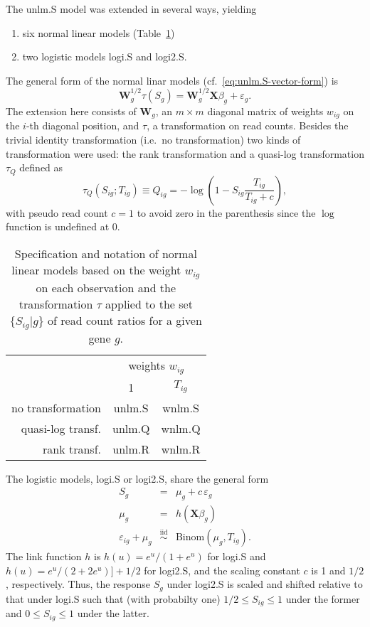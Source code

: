 \documentclass[letterpaper]{article}
\begin{document}
The unlm.S model was extended in several ways, yielding
\begin{enumerate}
\item six normal linear models (Table~\ref{tab:nlm})
\item two logistic models logi.S and logi2.S.
\end{enumerate}

The general form of the normal linar models
(cf.~\ref{eq:unlm.S-vector-form}) is
\begin{equation}
\mathbf{W}_g^{1/2} \tau(S_g) = \mathbf{W}_g^{1/2} \mathbf{X} \beta_g + \varepsilon_g.
\label{eq:nlm-general}
\end{equation}
The extension here consists of \(\mathbf{W}_g\), an \(m\times m\) diagonal matrix of
weights \(w_{ig}\) on the \(i\)-th diagonal position, and \(\tau\), a
transformation on read counts.  Besides the trivial identity transformation
(i.e.~no transformation) two kinds of transformation were used: the rank
transformation and a quasi-log transformation \(\tau_Q\) defined as
\begin{equation}
\tau_Q(S_{ig};T_{ig}) \equiv Q_{ig} = - \log \left( 1 - S_{ig} \frac{T_{ig}}{T_{ig} + c}
\right),
\label{eq:Q}
\end{equation}
with pseudo read count \(c=1\) to avoid zero in the parenthesis since the \(\log\)
function is undefined at \(0\).

\begin{table}
\begin{center}
\begin{tabular}{r|cc}
 & \multicolumn{2}{c}{weights \(w_{ig}\)} \\
 & 1 & \(T_{ig}\) \\
\hline
no transformation & unlm.S & wnlm.S \\
quasi-log transf. & unlm.Q & wnlm.Q \\
rank transf. & unlm.R & wnlm.R \\
\end{tabular}
\end{center}
\caption{Specification and notation of normal linear models based on the weight
\(w_{ig}\) on each observation and the
transformation \(\tau\) applied to the set \(\{S_{ig} | g\}\) of read count
ratios for a given gene \(g\).}
\label{tab:nlm}
\end{table}

The logistic models, logi.S or logi2.S, share the general form
\begin{eqnarray}
S_g &=& \mu_g + c\, \varepsilon_g
\label{eq:logi-general}
\\
\mu_g &=& h(\mathbf{X} \beta_g)
\label{eq:glm-mean-predictor}
\\
\varepsilon_{ig} + \mu_g &\overset{\mathrm{iid}}{\sim}& \mathrm{Binom}(\mu_g, T_{ig}).
\label{eq:binom-error}
\end{eqnarray}
The link function \(h\) is \(h(u) = e^u / (1 + e^u)\) for logi.S and \(h(u) =
e^u / (2 + 2e^u)] + 1/2\) for logi2.S, and the scaling constant \(c\) is 1
 and \(1/2\), respectively.  Thus, the response \(S_g\) under logi2.S is scaled and shifted relative to
that under logi.S such that (with probabilty one) \(1/2\le S_{ig}\le 1\) under the former and
\(0\le S_{ig}\le 1\) under the latter.
\end{document}
